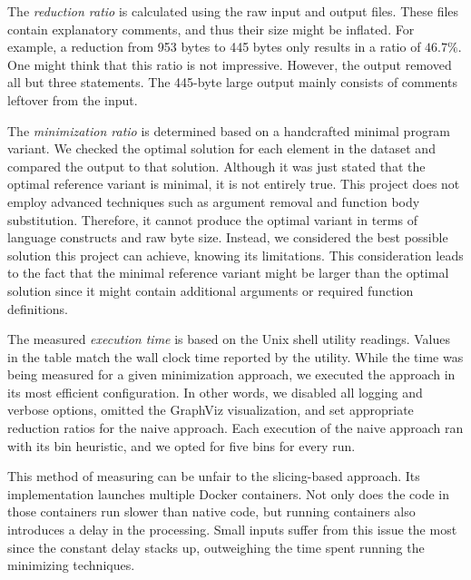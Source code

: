 The \emph{reduction ratio} is calculated using the raw input and output 
files. 
These files contain explanatory comments, and thus their size might be 
inflated. 
For example, a reduction from 953 bytes to 445 bytes only results in a ratio 
of $46.7\%$. 
One might think that this ratio is not impressive. 
However, the output removed all but three statements. 
The 445-byte large output mainly consists of comments leftover from the input.

The \emph{minimization ratio} is determined based on a handcrafted minimal 
program variant. 
We checked the optimal solution for each element in the dataset and compared 
the output to that solution. 
Although it was just stated that the optimal reference variant is minimal, 
it is not entirely true. 
This project does not employ advanced techniques such as argument removal 
and function body substitution. 
Therefore, it cannot produce the optimal variant in terms of language 
constructs and raw byte size. 
Instead, we considered the best possible solution this project can achieve, 
knowing its limitations. 
This consideration leads to the fact that the minimal reference variant 
might be larger than the optimal solution since it might contain additional 
arguments or required function definitions.

The measured \emph{execution time} is based on the  Unix shell 
utility readings. 
Values in the table match the wall clock time reported by the utility. 
While the time was being measured for a given minimization approach, we 
executed the approach in its most efficient configuration. 
In other words, we disabled all logging and verbose options, omitted 
the GraphViz visualization, and set appropriate reduction ratios for 
the naive approach. 
Each execution of the naive approach ran with its bin heuristic, and we 
opted for five bins for every run. 

This method of measuring can be unfair to the slicing-based approach. 
Its implementation launches multiple Docker containers. 
Not only does the code in those containers run slower than native code, 
but running containers also introduces a delay in the processing. 
Small inputs suffer from this issue the most since the constant delay stacks 
up, outweighing the time spent running the minimizing techniques.